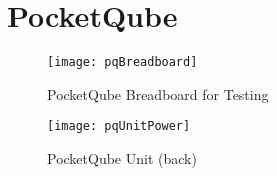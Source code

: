 \section{PocketQube}\label{sec:appendix_pq}
\begin{figure}[!htb]
    \centering
    \texttt{[image: pqBreadboard]}
    \caption{PocketQube Breadboard for Testing}
    \label{fig:pqBreadboard}
\end{figure}
\begin{figure}[!htb]
  \centering
  \texttt{[image: pqUnitPower]}
  \caption{PocketQube Unit (back)}
  \label{fig:pqUnitPower}
\end{figure}
\newpage